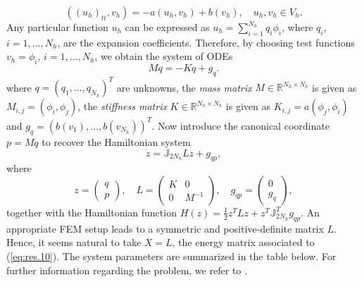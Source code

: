 \begin{equation} \label{eq:res.8}
	((u_h)_{tt},v_h) = - a(u_h,v_h) + b(v_h),\quad u_h,v_h\in V_h.
\end{equation}
Any particular function $u_h$ can be expressed as $u_h = \sum_{i=1}^{N_h} q_i \phi_i$, where $q_i$, $i=1,\dots,N_h$, are the expansion coefficients. Therefore, by choosing test functions $v_h = \phi_i$, $i=1,\dots,N_h$, we obtain the system of ODEs
\begin{equation} \label{eq:res.9}
	M\ddot q = -K q + g_{q}.
\end{equation}
where $q=(q_1,\dots,q_{N_h})^T$ are unknowns, the \emph{mass matrix} $M\in \mathbb R^{N_h\times N_h}$ is given as $M_{i,j} = (\phi_i,\phi_j)$, the \emph{stiffness matrix} $K\in \mathbb R^{N_h\times N_h}$ is given as $K_{i,j} = a(\phi_j,\phi_i)$ and $g_q=(b(v_1),\dots,b(v_{N_h}))^T$. Now introduce the canonical coordinate $p = M\dot q$ to recover the Hamiltonian system
\begin{equation} \label{eq:res.10}
	\dot z = \mathbb J_{2N_h} Lz + g_{qp},
\end{equation}
where
\begin{equation} \label{eq:res.11}
	z = 
	\begin{pmatrix}
	q \\
	p	
	\end{pmatrix}, \quad 
	L = 
	\begin{pmatrix}
	K & 0 \\
	0 & M^{-1}
	\end{pmatrix}, \quad
	g_{qp} =
	\begin{pmatrix}
	0 \\
	g_q
	\end{pmatrix},
\end{equation}
together with the Hamiltonian function $H(z) = \frac{1}{2} z^TLz + z^T \mathbb J_{2N_h}^T g_{qp}$. An appropriate FEM setup leads to a symmetric and positive-definite matrix $L$. Hence, it seems natural to take $X=L$, the energy matrix associated to (\ref{eq:res.10}). The system parameters are summarized in the table below. For further information regarding the problem, we refer to \cite{langtangen2017solving}.

